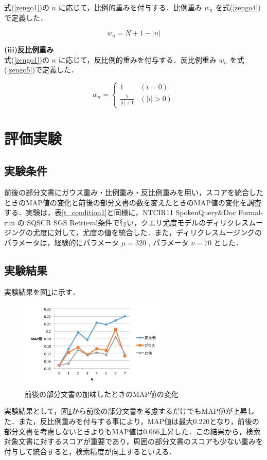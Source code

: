 式(\ref{zengo1})の $n$ に応じて，比例的重みを付与する．比例重み $w_n$ を式(\ref{zengo4})で定義した．

\begin{equation}
    w_n = N+1-|n|
    \label{zengo4}
\end{equation}

{\bf(iii)反比例重み} \\

式(\ref{zengo1})の $n$ に応じて，反比例的重みを付与する．反比例重み $w_n$ を式(\ref{zengo5})で定義した．

\begin{equation}
    w_n = 
    \begin{cases} 
        1 & (i = 0)\\ 
        \frac{1}{|i|+1} & (|i| > 0)
    \end{cases} 
    \label{zengo5}
\end{equation}

\section{評価実験}
\subsection{実験条件}

前後の部分文書にガウス重み・比例重み・反比例重みを用い，スコアを統合したときのMAP値の変化と前後の部分文書の数を変えたときのMAP値の変化を調査する．実験は，表\ref{t_condition1}と同様に，NTCIR11 SpokenQuery\&Doc Formal-run の SQSCR SGS Retrieval条件で行い，クエリ尤度モデルのディリクレスムージングの尤度に対して，尤度の値を統合した．また，ディリクレスムージングのパラメータは，経験的にパラメータ $\mu = 320$ , パラメータ $\nu = 70$ とした． 

\subsection{実験結果}
実験結果を図\ref{web_result1}に示す．

\begin{figure}[htbp]
    \centering
    \includegraphics[width=7cm]{./image/slide2.png}
    \caption{前後の部分文書の加味したときのMAP値の変化}
    \label{web_result1}
\end{figure}


実験結果として，図\ref{web_result1}から前後の部分文書を考慮するだけでもMAP値が上昇した．また，反比例重みを付与する事により，MAP値は最大0.220となり，前後の部分文書を考慮しないときよりもMAP値は0.066上昇した．この結果から，検索対象文書に対するスコアが重要であり，周囲の部分文書のスコアも少ない重みを付与して統合すると，検索精度が向上するといえる．

